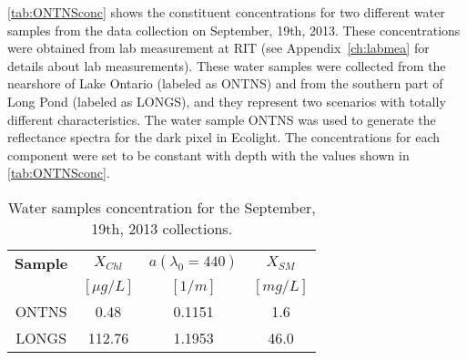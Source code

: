 \autoref{tab:ONTNSconc} shows the constituent concentrations for two different water samples from the data collection on September, 19th, 2013. These concentrations were obtained from lab measurement at RIT (see Appendix~\ref{ch:labmea} for details about lab measurements). These water samples were collected from the nearshore of Lake Ontario (labeled as ONTNS) and from the southern part of Long Pond (labeled as LONGS), and they represent two scenarios with totally different characteristics. The water sample ONTNS was used to generate the reflectance spectra for the dark pixel in Ecolight. The concentrations for each component were set to be constant with depth with the values shown in \autoref{tab:ONTNSconc}. 
\vspace{.5cm}
\begin{table}[!ht]
\caption{ Water samples concentration for the September, 19th, 2013 collections. \label{tab:ONTNSconc} } 
\centering
\begin{tabular}{c|c|c|c} 
 \bfseries{Sample} & \bfseries{$X_{Chl}$} & \bfseries{$a(\lambda_0=440)$}& \bfseries{$X_{SM}$}\\
 & $[\mu g/L]$ & $[1/m]$ & $[mg/L]$ \\ \hline \hline
ONTNS & 0.48 & 0.1151 & 1.6\\ 
LONGS & 112.76 & 1.1953 & 46.0\\ 
 \end{tabular}
\end{table}


